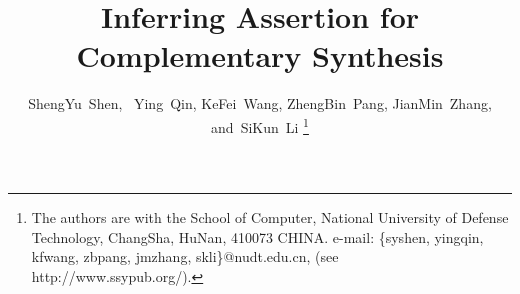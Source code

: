 \documentclass[journal]{IEEEtran}
\begin{document}
%
\title{Inferring Assertion for Complementary Synthesis}
%
%
%

\author{ShengYu~Shen,~
        Ying~Qin,
        KeFei~Wang,
        ZhengBin~Pang,
        JianMin~Zhang,
        and~SiKun~Li%
\thanks{The authors are with the School of Computer,
National University of Defense Technology, ChangSha,
HuNan, 410073 CHINA. e-mail: \{syshen, yingqin, kfwang, zbpang, jmzhang, skli\}@nudt.edu.cn, (see http://www.ssypub.org/).}%
}
%
%
\end{document}
